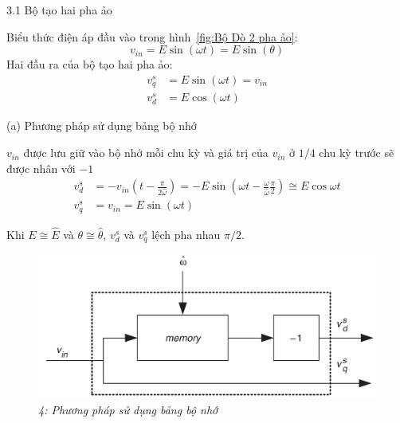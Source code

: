 \documentclass[11pt]{beamer}
\renewcommand{\label}[1]{%
			\gdef\sfname{sf:##1}}%
\begin{document}
\begin{frame}[t]{3.1 Bộ tạo hai pha ảo}
	
	Biểu thức điện áp đầu vào trong hình~\ref{fig:Bộ Dò 2 pha ảo}:
	$$v_{in}=E\sin({\omega t})=E\sin({\theta})$$
	Hai đầu ra của bộ tạo hai pha ảo:
	\begin{align*}
		{v}_q^s &=E\sin({\omega t})=v_{in}\\
		v_d^s &=E\cos({\omega t})
	\end{align*}


	
	
\end{frame}

	\begin{frame}[t]{(a) Phương pháp sử dụng bảng bộ nhớ}
				
				$v_{in}$ được lưu giữ vào bộ nhớ mỗi chu kỳ và				
				giá trị của $v_{in}$ ở $1/4$ chu kỳ trước sẽ được nhân với $-1$
				\begin{align*}
					v_d^s&=-v_{in} \left( t-\frac{\pi}{2 \hat{\omega}} \right)=-E \sin{\left( \omega t-\frac{\omega}{\hat{\omega}} \frac{\pi}{2}  \right)} \cong E \cos{\omega t}\\
					v_q^s &= v_{in} = E\sin({\omega t})
				\end{align*}
				
				Khi $E \cong \hat{E}$ và $\theta \cong \hat{\theta}$, $v_d^s$ và $v_q^s$ lệch pha nhau $\pi/2$.
				
				\begin{figure}[h]
					\includegraphics[width=.7\textwidth]{Fig. 4 Method using memory table.png}
					\caption{\centering \textit{4: Phương pháp sử dụng bảng bộ nhớ}}
					\label{fig:4: Phương pháp sử dụng bảng bộ nhớ}
				\end{figure}
					
	\end{frame}
\end{document}

